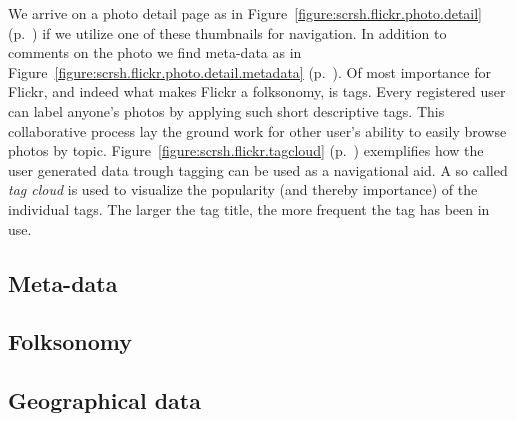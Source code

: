 We arrive on a photo detail page as in
Figure~\ref{figure:scrsh.flickr.photo.detail}
(p.~\pageref{figure:scrsh.flickr.photo.detail})
if we utilize one of these thumbnails for navigation. In addition to comments
on the photo we find meta-data as in 
Figure~\ref{figure:scrsh.flickr.photo.detail.metadata}
(p.~\pageref{figure:scrsh.flickr.photo.detail.metadata}). Of most importance
for Flickr, and indeed what makes Flickr a folksonomy, is tags. Every
registered user can label anyone's photos by applying such short descriptive
tags. This collaborative process lay the ground work for other user's ability
to easily browse photos by topic.
Figure~\ref{figure:scrsh.flickr.tagcloud}
(p.~\pageref{figure:scrsh.flickr.tagcloud}) exemplifies how the user generated
data trough tagging can be used as a navigational aid. A so called \emph{tag
cloud} is used to visualize the popularity (and thereby importance) of the
individual tags. The larger the tag title, the more frequent the tag has been
in use.


\subsection{Meta-data}

\subsection{Folksonomy}

\subsection{Geographical data}


